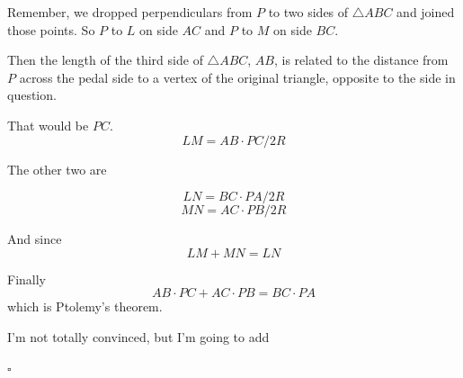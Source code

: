 \documentclass[11pt, oneside]{article}
\begin{document}
Remember, we dropped perpendiculars from $P$ to two sides of $\triangle ABC$ and joined those points.  So $P$ to $L$ on side $AC$ and $P$ to $M$ on side $BC$.

Then the length of the third side of $\triangle ABC$, $AB$, is related to the distance from $P$ across the pedal side to a vertex of the original triangle, opposite to the side in question.

That would be $PC$.
\[  LM = AB \cdot PC/2R \]

The other two are 

\[ LN = BC \cdot PA/2R \]
\[ MN = AC \cdot PB/2R \]

And since 
\[ LM + MN = LN \]

Finally
\[ AB \cdot PC + AC \cdot PB = BC \cdot PA  \]
which is Ptolemy's theorem.

I'm not totally convinced, but I'm going to add

$\square$
\end{document}
